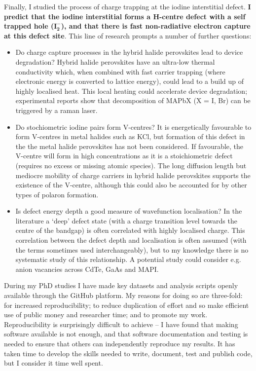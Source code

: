 Finally, I studied the process of charge trapping at the iodine interstitial defect. \textbf{I predict that the iodine interstitial forms a H-centre defect with a self trapped hole ($\mathbf{I_2^-}$), and that there is fast non-radiative electron capture at this defect site}. This line of research prompts a number of further questions:
\begin{itemize}
    \item Do charge capture processes in the hybrid halide perovskites lead to device degradation? Hybrid halide perovskites have an ultra-low thermal conductivity\autocite{Whalley2016} which, when combined with fast carrier trapping (where electronic energy is converted to lattice energy), could lead to a build up of highly localised heat. This local heating could accelerate device degradation; experimental reports show that decomposition of MAPbX (X = I, Br) can be triggered by a raman laser.\autocite{Ledinski2015}
    \item Do stochiometric iodine pairs form V-centres? It is energetically favourable to form V-centres in metal halides such as KCl,\autocite{Castner1957} but formation of this defect in the the metal halide perovskites has not been considered. If favourable, the V-centre will form in high concentrations as it is a stoichiometric defect (requires no excess or missing atomic species). The long diffusion length but mediocre mobility of charge carriers in hybrid halide perovskites\autocite{Brenner2015} supports the existence of the V-centre, although this could also be accounted for by other types of polaron formation. 
    \item Is defect energy depth a good measure of wavefunction localisation? In the literature a `deep' defect state (with a charge transition level towards the centre of the bandgap) is often correlated with highly localised charge. This correlation between the defect depth and localisation is often assumed (with the terms sometimes used interchangeably), but to my knowledge there is no systematic study of this relationship. A potential study could consider e.g. anion vacancies across CdTe, GaAs and MAPI.
\end{itemize}

During my PhD studies I have made key datasets and analysis scripts openly available through the GitHub platform. My reasons for doing so are three-fold: for increased reproducibility; to reduce duplication of effort and so make efficient use of public money and researcher time; and to promote my work. Reproducibility is surprisingly difficult to achieve -- I have found that making software available is not enough, and that software documentation and testing is needed to ensure that others can independently reproduce my results. It has taken time to develop the skills needed to write, document, test and publish code, but I consider it time well spent.

